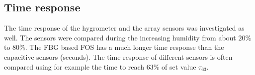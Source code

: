 \begin{table}[!h]
\centering
\caption{Comparison of the temperature and humidity sensitivity obtained through calibration based on different approaches.}
\label{tab:fos}
\end{table}
\subsection{Time response}
The time response of the hygrometer and the array sensors was investigated as well. The sensors were compared during the increasing humidity from about $20$\% to $80$\%. The \gls{FBG} based \gls{FOS} has a much longer time response than the capacitive sensors (seconds). The time response of different sensors is often compared using for example the time to reach $63$\% of set value $\tau_{63}$.

